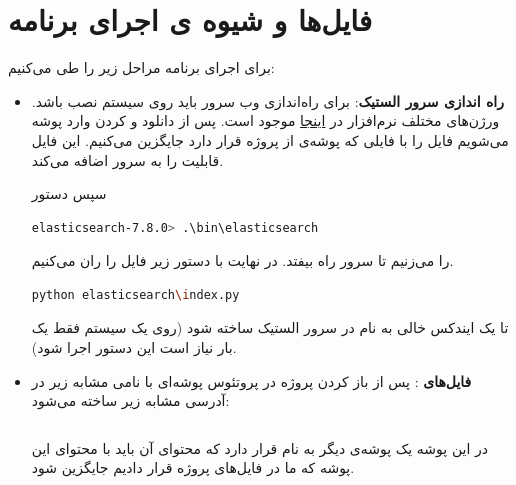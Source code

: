 \section{فایل‌ها و شیوه ‌ی اجرای برنامه}
برای اجرای برنامه مراحل زیر را طی می‌کنیم:
\begin{itemize}
	\item 
	\textbf{راه اندازی سرور الستیک}:
	برای راه‌اندازی وب سرور باید  
	روی سیستم نصب باشد. ورژن‌های مختلف نرم‌افزار در 
	\href{https://www.elastic.co/downloads/elasticsearch}{اینجا}
	موجود است. پس از دانلود و 
	کردن وارد پوشه می‌شویم فایل 
	را با فایلی که پوشه‌ی 
	از پروژه قرار دارد جایگزین می‌کنیم. این فایل قابلیت 
	را به سرور اضافه می‌کند. 
	
	 سپس دستور 
\begin{latin}
\begin{lstlisting}[language=bash]
elasticsearch-7.8.0> .\bin\elasticsearch
\end{lstlisting}
\end{latin}
را می‌زنیم تا سرور راه بیفتد. در نهایت با دستور زیر فایل 
را ران می‌کنیم.  
\begin{latin}
\begin{lstlisting}[language=bash]
python elasticsearch\index.py
\end{lstlisting}
\end{latin}
تا یک ایندکس خالی به نام 
در سرور الستیک ساخته شود (روی یک سیستم فقط یک بار نیاز است این دستور اجرا شود). 
	\item 
	\textbf{فایل‌های }:
	پس از باز کردن پروژه در پروتئوس پوشه‌ای با نامی مشابه زیر در آدرسی مشابه زیر ساخته می‌شود:
\begin{latin}
\begin{lstlisting}[language=bash]

\end{lstlisting}
\end{latin}	
در این پوشه یک پوشه‌ی دیگر به نام 
قرار دارد که محتوای آن باید با محتوای این پوشه که ما در فایل‌های پروژه قرار دادیم جایگزین شود. 
		

\end{itemize}
